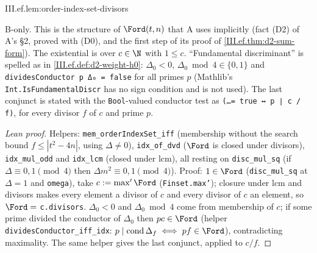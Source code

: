 \begin{lemma}
\bonly
{}
\end{lemma}
\begin{tfformal}{III.ef.lem:order-index-set-divisors}
\begin{tffidelity}
B-only. This is the structure of $\Ford(t,n)$ that A uses implicitly (fact (D2) of A's \S2, proved with (D0), and the first step of its proof of \cref{III.ef.thm:d2-sum-form}). The existential is over $c\in\N$ with $1\le c$. ``Fundamental discriminant'' is spelled as in \cref{III.ef.def:d2-weight-h0}: $\Delta_0<0$, $\Delta_0\bmod4\in\{0,1\}$ and \texttt{dividesConductor p Δ₀ = false} for all primes $p$ (Mathlib's \texttt{Int.IsFundamentalDiscr} has no sign condition and is not used). The last conjunct is stated with the \texttt{Bool}-valued conductor test as \texttt{(\dots = true ↔ p ∣ c / f)}, for every divisor $f$ of $c$ and prime $p$.
\end{tffidelity}
\end{tfformal}
\begin{proof}[Lean proof]
Helpers: \texttt{mem\_orderIndexSet\_iff} (membership without the search bound $f\le|t^2-4n|$, using $\Delta\ne0$), \texttt{idx\_of\_dvd} ($\Ford$ is closed under divisors), \texttt{idx\_mul\_odd} and \texttt{idx\_lcm} (closed under lcm), all resting on \texttt{disc\_mul\_sq} (if $\Delta\equiv0,1\pmod4$ then $\Delta m^2\equiv0,1\pmod4$). Proof: $1\in\Ford$ (\texttt{disc\_mul\_sq} at $\Delta=1$ and \texttt{omega}), take $c:=\max'\Ford$ (\texttt{Finset.max'}); closure under lcm and divisors makes every element a divisor of $c$ and every divisor of $c$ an element, so $\Ford=$ \texttt{c.divisors}. $\Delta_0<0$ and $\Delta_0\bmod4$ come from membership of $c$; if some prime divided the conductor of $\Delta_0$ then $pc\in\Ford$ (helper \texttt{dividesConductor\_iff\_idx}: $p\mid\mathrm{cond}\,\Delta_f\iff pf\in\Ford$), contradicting maximality. The same helper gives the last conjunct, applied to $c/f$.
\end{proof}

